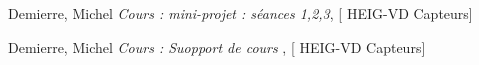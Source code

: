 \begin{thebibliography}{9}

    Demierre, Michel
    \textit{Cours : mini-projet : séances 1,2,3},
    [ HEIG-VD Capteurs]
    
    Demierre, Michel
    \textit{Cours : Suopport de cours },
    [ HEIG-VD Capteurs]
    
    
    \end{thebibliography}